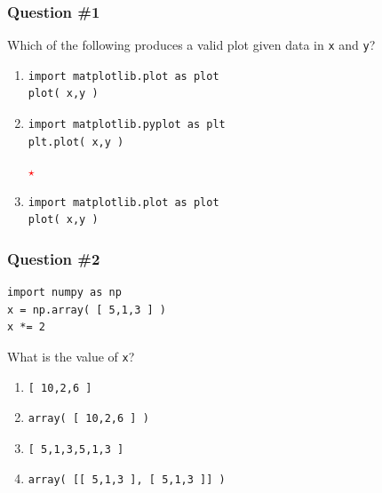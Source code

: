 \documentclass[11pt]{beamer}
\newcommand{\correctstar}{\textcolor{red}{$\star$}}
\begin{document}
\begin{frame}[fragile]
  \frametitle{Question \#1}
  \Enlarge

  Which of the following produces a valid plot given data in \texttt{x} and \texttt{y}?

  \begin{enumerate}[label=\Alph*]
  \item
  \begin{Verbatim}
import matplotlib.plot as plot
plot( x,y )
  \end{Verbatim}
  \item
  \begin{Verbatim}
import matplotlib.pyplot as plt
plt.plot( x,y )
  \end{Verbatim}
  \correctstar
  \item
  \begin{Verbatim}
import matplotlib.plot as plot
plot( x,y )
  \end{Verbatim}
  \end{enumerate}
\end{frame}

\begin{frame}[fragile]
  \frametitle{Question \#2}
  \Enlarge

  \begin{Verbatim}
import numpy as np
x = np.array( [ 5,1,3 ] )
x *= 2
  \end{Verbatim}

  What is the value of \texttt{x}?

  \begin{enumerate}[label=\Alph*]
  \item
  \begin{Verbatim}
[ 10,2,6 ]
  \end{Verbatim}
  \item
  \begin{Verbatim}
array( [ 10,2,6 ] )
  \end{Verbatim}
  \item
  \begin{Verbatim}
[ 5,1,3,5,1,3 ]
  \end{Verbatim}
  \item
  \begin{Verbatim}
array( [[ 5,1,3 ], [ 5,1,3 ]] )
  \end{Verbatim}
  \end{enumerate}
\end{frame}
\end{document}
